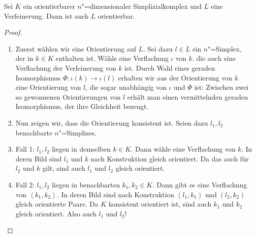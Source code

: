 \documentclass[ngerman, 11pt, a4paper, twoside, abstracton]{scrartcl}
\begin{document}
\begin{lemma}
  Sei $K$ ein orientierbarer $n$"=dimensionaler Simplizialkomplex und $L$ eine Verfeinerung. Dann ist auch $L$ orientierbar.
\end{lemma}
\begin{proof}
  \begin{enumerate}
    \item Zuerst wählen wir eine Orientierung auf $L$. Sei dazu $l\in L$ ein $n$"=Simplex, der in $k\in K$ enthalten ist. Wähle eine Verflachung $\iota$ von $k$. die auch eine Verflachung der Verfeinerung von $k$ ist. Durch Wahl eines geraden Isomorphismus $\Phi\colon\iota\left( k \right)\to\iota\left( l \right)$ erhalten wir aus der Orientierung von $k$ eine Orientierung von $l$, die sogar unabhängig von $\iota$ und $\Phi$ ist: Zwischen zwei so gewonnenen Orientierungen von $l$ erhält man einen vermittelnden geraden Isomorphismus, der ihre Gleichheit bezeugt.
    \item Nun zeigen wir, dass die Orientierung konsistent ist. Seien dazu $l_1, l_2$ benachbarte $n$"=Simplizes.
    \item Fall 1: $l_1, l_2$ liegen in demselben $k\in K$. Dann wähle eine Verflachung von $k$. In deren Bild sind $l_1$ und $k$ nach Konstruktion gleich orientiert. Da das auch für $l_2$ und $k$ gilt, sind auch $l_1$ und $l_2$ gleich orientiert.
    \item Fall 2: $l_1, l_2$ liegen in benachbarten $k_1, k_2\in K$. Dann gibt es eine Verflachung von $\left<k_1, k_2\right>$. In deren Bild sind nach Konstruktion $\left( l_1, k_1 \right)$ und $\left( l_2, k_2 \right)$ gleich orientierte Paare. Da $K$ konsistent orientiert ist, sind auch $k_1$ und $k_2$ gleich orientiert. Also auch $l_1$ und $l_2$!
  \end{enumerate}
\end{proof}
\end{document}
